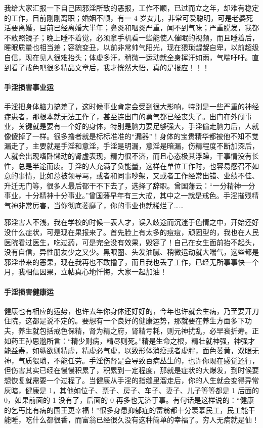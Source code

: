 \begin{case}[手淫损害婚姻运]
    我给大家汇报一下自己因邪淫所致的恶报，工作不顺，已过而立之年，却难有稳定的工作，目前刚刚离职；婚姻不顺，有一 4 岁女儿，非常可爱聪明，可是老婆死活要离婚，目前已经离婚大半年；鼻炎和咽炎严重，闻不到气味；严重脱发，我都不敢照镜子；晚上睡不着觉，必须拿手机看一些能使人催眠的视频，而且睡着后，睡眠质量也相当差；容貌变丑，以前非常帅气阳光，现在猥琐龌龊自卑，以前超级自信，现在见人很难抬头；体虚多汗，稍微一运动就全身挥汗如雨，气喘吁吁。直到看了戒色吧很多精品文章后，我才恍然大悟，真的是报应！！！
\end{case}

\paragraph{手淫损害事业运}

手淫把身体脑力搞差了，这时候事业肯定会受到很大影响，特别是一些严重的神经症患者，那根本就无法工作了，甚至连出门的勇气都已经丧失了。出门在外闯事业，关键就是要有一个好的身体，特别是脑力要足够强大，手淫偷走脑力后，人就像傻掉了一样。很多撸者就是标标准准的“漏器”！身体的宝贵精华都被他不知不觉漏走了，主要就是手淫和意淫，手淫是明漏，意淫是暗漏，伤精程度不断加深后，人就会出现嗜卧懒动的肾虚表现，精力很不济，而且心态极其浮躁，干事情没有长性，总是半途而废。手淫的人充满了负能量，这样在单位工作时，也容易感召不如意的事情，比如总被领导骂，或者和同事吵架，又或者工作经常出错、业绩不佳、升迁无门等，很多人最后都干不下去了，选择了辞职。曾国藩云：“一分精神一分事业，十分精神十分事业。”曾国藩早年有三大戒，其中之一就是戒色。手淫摧残精气神非常厉害，当你彻底萎靡了，你的事业也就稀烂了……

\begin{case}[手淫损害事业运]
    邪淫害人不浅，我在学校的时候一表人才，误入歧途而沉迷于色情之中，开始还好没什么症状，可是现在果报来了。首先脸上有太多的痘痘，顽固型的，我也在人民医院看过医生，吃过药，可是完全没有效果，毁容了！自己在女生面前抬不起头，没有自信，异性朋友少之又少。黑眼圈、头发油腻、稍微运动就大喘气，这些都是邪淫带来的恶果，现在我再也不敢撸了，而且我也丢了工作，已经无所事事快一个月，我相信因果，立帖真心地忏悔，大家一起加油！
\end{case}

\paragraph{手淫损害健康运}

健康也有相应的运势，也许去年你身体还好好的，今年也许就会生病，乃至要开刀住院，这都是说不定的。要想有一个良好的健康运势，那就要在养生方面多下功夫，养生就包括戒色保精，肾为精之府，肾精亏耗，则元神扰乱，必早衰折寿。正如药王孙思邈所言：“精少则病，精尽则死。”精是生命之根，精壮就神强，神强才能益寿，如纵欲则精虚，精虚必气虚，以致形体消瘦或者虚胖，面色萎黄，双眼无神，气质猥琐，不能任劳。手淫伤肾是会导致百病丛生的，也许你现在感觉还行，但伤害其实已经在慢慢积累了，积累到一定程度，那就是症状的大爆发，到时候要想恢复就需要一个过程了。当健康从手淫的指缝里溜走后，你的人生就会变得异常灰暗，健康是 1，其他如位子、票子、房子、车子、妻子、儿子等等都是 1 后面的 0，如果前面的 1 没有了，后面的 0 再多也无济于事。有句话是这样说的：“健康的乞丐比有病的国王更幸福！”很多身患抑郁症的富翁都十分羡慕民工，民工能干能睡，吃什么都很香，而富翁已经很久没有这种简单的幸福了。穷人无病就是仙！

